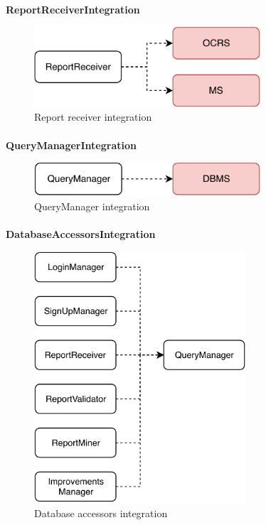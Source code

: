 			\paragraph{}
				\textbf{ReportReceiverIntegration}
					\begin{figure}[!h]
						\centering
						\includegraphics[width=0.75\textwidth]{images/Integration/ReportReceiverIntegration.pdf}
						\caption{Report receiver integration}
					\end{figure}
			\paragraph{}
				\textbf{QueryManagerIntegration}
					\begin{figure}[!h]
						\centering
						\includegraphics[width=0.75\textwidth]{images/Integration/QueryManagerIntegration.pdf}
						\caption{QueryManager integration}
					\end{figure}
			\clearpage
			\paragraph{}
				\textbf{DatabaseAccessorsIntegration}
			
					\begin{figure}[!h]
						\centering
						\includegraphics[width=0.7\textwidth]{images/Integration/DatabaseAccessorsIntegration.pdf}
						\caption{Database accessors integration}
					\end{figure}
